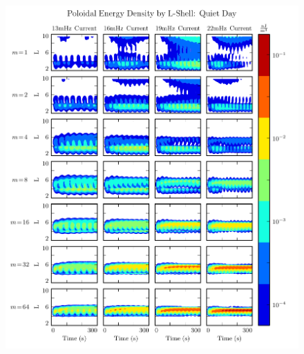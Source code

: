 \begin{figure}[!htb]
    \centering
    \includegraphics[width=\textwidth]{figures/layers_day_p.pdf}
    \caption[Dayside Poloidal Energy Distribution]{
      \todo{$\cdots$}
    }
    \label{fig_layers_day_p}
\end{figure}

